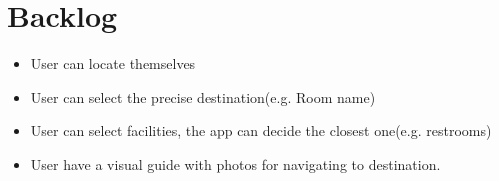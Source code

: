\documentclass[12pt]{article}
\begin{document}
\section{Backlog}

\begin{itemize}
\item User can locate themselves 
\item User can select the precise destination(e.g. Room name)
\item User can select facilities, the app can decide the closest one(e.g. restrooms)
\item User have a visual guide with photos for navigating to destination.


\end{itemize}
\end{document}
